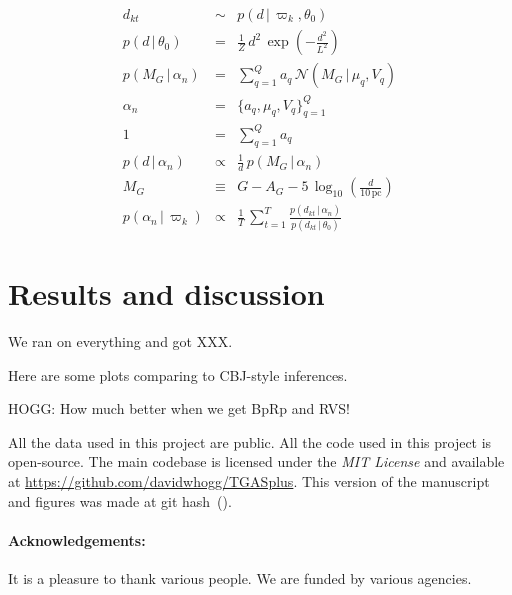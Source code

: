 \documentclass[12pt]{article}
\newcommand{\project}[1]{\textsl{#1}}
\newcommand{\acronym}[1]{\small{#1}}
\newcommand{\given}{\,|\,}
\newcommand{\normal}{\mathcal{N}}
\newcommand{\setof}[1]{\{{#1}\}}
\newcommand{\pc}{\mathrm{pc}}
\begin{document}
\begin{eqnarray}
  d_{kt} &\sim& p(d\given\varpi_k,\theta_0)
  \\
  p(d\given\theta_0) &=& \frac{1}{Z}\,d^2\,\exp(-\frac{d^2}{L^2})
  \\
  p(M_G\given\alpha_n) &=& \sum_{q=1}^Q a_q\,\normal(M_G\given\mu_q,V_q)
  \\
  \alpha_n &=& \setof{a_q, \mu_q, V_q}_{q=1}^Q
  \\
  1 &=& \sum_{q=1}^Q a_q
  \\
  p(d\given\alpha_n) &\propto& \frac{1}{d}\,p(M_G\given\alpha_n)
  \\
  M_G &\equiv& G - A_G - 5\,\log_{10}(\frac{d}{10\,\pc})
  \\
  p(\alpha_n\given\varpi_k) &\propto& \frac{1}{T}\,\sum_{t=1}^T \frac{p(d_{kt}\given\alpha_n)}{p(d_{kt}\given\theta_0)}
\end{eqnarray}

\section{Results and discussion}
We ran on everything and got XXX.

Here are some plots comparing to CBJ-style inferences.

HOGG: How much better when we get BpRp and RVS!

All the data used in this project are public. All the code used in
this project is open-source. The main codebase is licensed under the
\project{\acronym{MIT} License} and available at
\url{https://github.com/davidwhogg/TGASplus}. This version of the
manuscript and figures was made at git hash
\textsf{\githash\,(\gitdate)}.

\paragraph{Acknowledgements:}
It is a pleasure to thank various people.
We are funded by various agencies.
\end{document}
